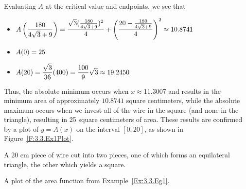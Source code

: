 \begin{example}
Evaluating $A$ at the critical value and endpoints, we see that
\begin{itemize}
	\item $\displaystyle A\left(\frac{180}{4\sqrt{3}+9}\right) = \frac{\sqrt{3}(\frac{180}{4\sqrt{3}+9})^2}{4} + \left( \frac{20-\frac{180}{4\sqrt{3}+9}}{4} \right)^2 \approx 10.8741$
	\item $\displaystyle A(0) = 25$
	\item $\displaystyle A(20) = \frac{\sqrt{3}}{36}(400) = \frac{100}{9} \sqrt{3} \approx 19.2450$
\end{itemize}
Thus, the absolute minimum occurs when $x \approx 11.3007$ and results in the minimum area of approximately $10.8741$ square centimeters, while the absolute maximum occurs when we invest all of the wire in the square (and none in the triangle), resulting in 25 square centimeters of area.  These results are confirmed by a plot of $y = A(x)$ on the interval $[0,20]$, as shown in Figure~\ref{F:3.3.Ex1Plot}.
\end{example}

\begin{marginfigure}[-32cm]
\caption{A 20 cm piece of wire cut into two pieces, one of which forms an equilateral triangle, the other which yields a square.} \label{F:3.3.Ex1}
\end{marginfigure}

\begin{marginfigure}[-10cm]
\caption{A plot of the area function from Example~\ref{Ex:3.3.Eg1}.} \label{F:3.3.Ex1Plot}
\end{marginfigure}